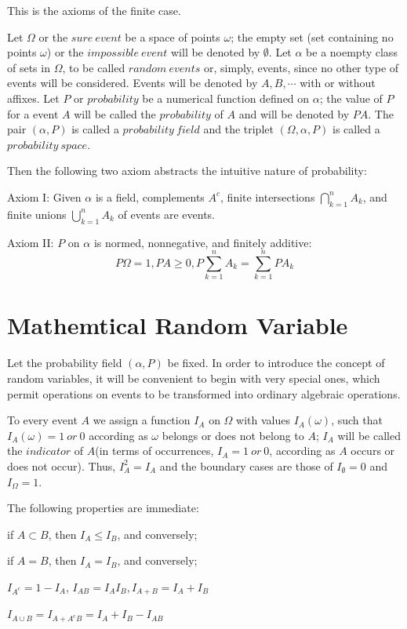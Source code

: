 \documentclass[a4paper]{book}
\begin{document}
  This is the axioms of the finite case.

  Let $\Omega$ or the $sure\ event$ be a space of points $\omega$; the
  empty set (set containing no points $\omega$) or the $impossible\
  event$ will be denoted by $\emptyset$. Let $\alpha$ be a noempty class
  of sets in $\Omega$, to be called $random\ events$ or, simply, events,
  since no other type of events will be considered. Events will be
  denoted by $A,B, \cdots$ with or without affixes. Let $P$ or
  $probability$ be a numerical function defined on $\alpha$; the value
  of $P$ for a event $A$ will be called the $probability$ of $A$ and
  will be denoted by $PA$. The pair $(\alpha,P)$ is called a
  $probability\ field$ and the triplet $(\Omega, \alpha, P)$ is called a
  $probability\ space$.\cite{1977probability}

  Then the following two axiom abstracts the intuitive nature of
  probability:\cite{1977probability}

  Axiom I: Given $\alpha$ is a field, complements $A^c$, finite
  intersections $\bigcap\limits^n_{k=1}A_k$, and finite unions
  $\bigcup\limits^n_{k=1}A_k$ of events are events.

  Axiom II: $P$ on $\alpha$ is normed, nonnegative, and finitely
  additive:
  \begin{displaymath}
    P\Omega = 1, PA \geq 0, P\sum\limits^{n}_{k=1}A_k =
    \sum\limits^{n}_{k=1}PA_k
  \end{displaymath}

\section{Mathemtical Random Variable}

  Let the probability field $(\alpha, P)$ be fixed. In order to
  introduce the concept of random variables, it will be convenient to
  begin with very special ones, which permit operations on events to be
  transformed into ordinary algebraic operations.\cite{1977probability}

  To every event $A$ we assign a function $I_A$ on $\Omega$ with values
  $I_A(\omega)$, such that $I_A(\omega) = 1\ or\ 0$ according as
  $\omega$ belongs or does not belong to $A$; $I_A$ will be called the
  $indicator$ of $A$(in terms of occurrences, $I_A = 1\ or\ 0$,
  according as $A$ occurs or does not occur). Thus, $I_A^2 = I_A$ and
  the boundary cases are those of $I_\emptyset = 0$ and $I_\Omega =
  1$.\cite{1977probability}

  The following properties are immediate\cite{1977probability}:
  \begin{compactitem}
    \item if $A \subset B$, then $I_A \leq I_B$, and conversely;
    \item if $A = B$, then $I_A = I_B$, and conversely;
    \item $I_{A^c} = 1 - I_A$, $I_{AB} = I_AI_B, I_{A+B} = I_A + I_B$
    \item $I_{A\cup B} = I_{A+A^cB} = I_A + I_B - I_{AB}$
  \end{compactitem}
\end{document}

